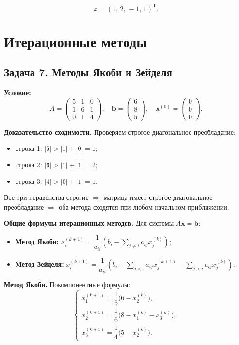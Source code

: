 \documentclass{article}
\begin{document}
$$\boxed{x = (1,\,2,\,-1,\,1)^\text{T}.}$$



\section*{Итерационные методы}

\subsection*{Задача 7. Методы Якоби и Зейделя}
\textbf{Условие:}
$$
A = \begin{pmatrix} 5 & 1 & 0 \\ 1 & 6 & 1 \\ 0 & 1 & 4 \end{pmatrix}, \quad 
\textbf{b} = \begin{pmatrix} 6 \\ 8 \\ 5 \end{pmatrix}, \quad 
\textbf{x}^{(0)} = \begin{pmatrix} 0 \\ 0 \\ 0 \end{pmatrix}.
$$

\textbf{Доказательство сходимости.} Проверяем строгое диагональное преобладание:
\begin{itemize}
    \item строка 1: $|5| > |1| + |0| = 1$;
    \item строка 2: $|6| > |1| + |1| = 2$;
    \item строка 3: $|4| > |0| + |1| = 1$.
\end{itemize}
Все три неравенства строгие $\Rightarrow$ матрица имеет строгое диагональное преобладание $\Rightarrow$ оба метода сходятся при любом начальном приближении.

\textbf{Общие формулы итерационных методов.} Для системы $A\textbf{x} = \textbf{b}$:
\begin{itemize}
    \item \textbf{Метод Якоби:} $x_i^{(k+1)} = \dfrac{1}{a_{ii}}\left(b_i - \displaystyle\sum_{j \neq i} a_{ij} x_j^{(k)}\right)$;
    \item \textbf{Метод Зейделя:} $x_i^{(k+1)} = \dfrac{1}{a_{ii}}\left(b_i - \displaystyle\sum_{j < i} a_{ij} x_j^{(k+1)} - \sum_{j > i} a_{ij} x_j^{(k)}\right)$.
\end{itemize}

\textbf{Метод Якоби.} Покомпонентные формулы:
$$
\begin{cases}
x_1^{(k+1)} = \dfrac{1}{5}\bigl(6 - x_2^{(k)}\bigr), \\[6pt]
x_2^{(k+1)} = \dfrac{1}{6}\bigl(8 - x_1^{(k)} - x_3^{(k)}\bigr), \\[6pt]
x_3^{(k+1)} = \dfrac{1}{4}\bigl(5 - x_2^{(k)}\bigr).
\end{cases}
$$
\end{document}

